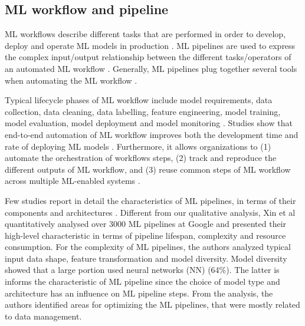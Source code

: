 \subsection{ML workflow and pipeline}

ML workflows describe different tasks that are performed in order to develop, deploy and operate ML models in production \cite{Amershi2019}. ML pipelines are used to express the complex input/output relationship between the different tasks/operators of an automated ML workflow \cite{Doris2021MLPipelines}. Generally, ML pipelines plug together several tools when automating the ML workflow \cite{Hummer2019IBM}.

Typical lifecycle phases of ML workflow include model requirements, data collection, data cleaning, data labelling, feature engineering, model training, model evaluation, model deployment and model monitoring \cite{Amershi2019}. Studies show that end-to-end automation of ML workflow improves both the development time and rate of deploying ML models \cite{Hummer2019IBM,Doris2021MLPipelines}. Furthermore, it allows organizations to (1) automate the orchestration of workflows steps, (2) track and reproduce the different outputs of ML workflow, and (3) reuse common steps of ML workflow across multiple ML-enabled systems \cite{Baylor2017, Hummer2019IBM}. %

Few studies report in detail the characteristics of ML pipelines, in terms of their components and architectures \cite{Hummer2019IBM,Doris2021MLPipelines}. Different from our qualitative analysis, Xin et al \cite{Doris2021MLPipelines} quantitatively analysed over 3000 ML pipelines at Google and presented their high-level characteristic in terms of pipeline lifespan, complexity and resource consumption. For the complexity of ML pipelines, the authors analyzed typical input data shape, feature transformation and model diversity. Model diversity showed that a large portion used neural networks (NN) (64\%). The latter is informs the characteristic of ML pipeline since the choice of model type and architecture has an influence on ML pipeline steps. From the analysis, the authors \cite{Doris2021MLPipelines} identified areas for optimizing the ML pipelines, that were mostly related to data management. 





